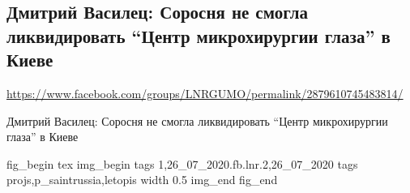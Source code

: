  
 
  
\subsection{Дмитрий Василец: Соросня не смогла ликвидировать “Центр микрохирургии глаза” в Киеве}
\label{sec:26_07_2020.fb.lnr.2}
\url{https://www.facebook.com/groups/LNRGUMO/permalink/2879610745483814/}

Дмитрий Василец: Соросня не смогла ликвидировать “Центр микрохирургии глаза” в Киеве

\ifcmt
fig_begin 
  tex \centering
  img_begin 
    tags 1,26_07_2020.fb.lnr.2,26_07_2020
    tags projs,p_saintrussia,letopis
    width 0.5
  img_end
fig_end
\fi

